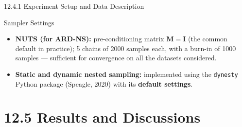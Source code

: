 \documentclass[aspectratio=169,10pt]{beamer}
\begin{document}
\begin{frame}[allowframebreaks]{12.4.1 Experiment Setup and Data Description}
\begin{block}{Sampler Settings}
\begin{itemize}
  \item \textbf{NUTS (for ARD-NS):} pre-conditioning matrix $\mathbf{M}=\mathbf{I}$ (the common default in practice); 5 chains of 2000 samples each, with a burn-in of 1000 samples --- sufficient for convergence on all the datasets considered.
  \item \textbf{Static and dynamic nested sampling:} implemented using the \texttt{dynesty} Python package (Speagle, 2020) with its \textbf{default settings}.
\end{itemize}
\end{block}

\end{frame}

\section{12.5 Results and Discussions}
\end{document}

